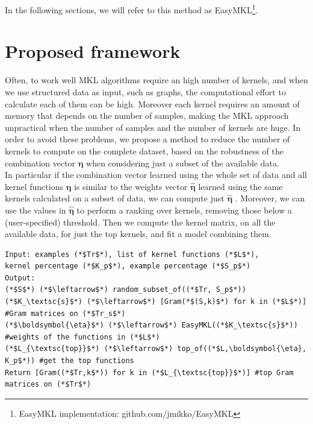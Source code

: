 \documentclass{esannV2}
\newcommand{\yy}{{\bf y}}
\newcommand{\KK}{{\bf K}}
\newcommand{\YY}{{\bf Y}}
\newcommand{\XX}{{\bf X}}
\newcommand{\1}{{\bf 1}}
\begin{document}
In the following sections, we will refer to this method as EasyMKL\footnote{EasyMKL implementation: github.com/jmikko/EasyMKL}.


\section{Proposed framework}
Often, to work well MKL algorithms require an high number of kernels, and when we use structured data as input, such as graphs, the computational effort to calculate each of them can be high. Moreover each kernel requires an amount of memory that depends on the number of samples, making the MKL approach unpractical when the number of samples and the number of kernels are huge.
In order to avoid these problems, we propose a method to reduce the number of kernels to compute on the complete dataset, based on the robustness of the combination vector $\boldsymbol{\eta}$ when considering just a subset of the available data.\\
In particular if the combination vector learned using the whole set of data and all kernel functions $\boldsymbol{\eta}$ is similar to the weights vector $\hat{\boldsymbol{\eta}}$ learned using the same kernels calculated on a subset of data, we can compute just $\hat{\boldsymbol{\eta}}$ .
Moreover, we can use the values in $\hat{\boldsymbol{\eta}}$ to perform a ranking over kernels, removing those below a (user-specified) threshold.
Then we compute the kernel matrix, on all the available data, for just the top kernels, and fit a model combining them.



\begin{lstlisting}
Input: examples (*$Tr$*), list of kernel functions (*$L$*),
kernel percentage (*$K_p$*), example percentage (*$S_p$*) 
Output: 
(*$S$*) (*$\leftarrow$*) random_subset_of((*$Tr, S_p$*))
(*$K_\textsc{s}$*) (*$\leftarrow$*) [Gram(*$(S,k)$*) for k in (*$L$*)] #Gram matrices on (*$Tr_s$*)
(*$\boldsymbol{\eta}$*) (*$\leftarrow$*) EasyMKL((*$K_\textsc{s}$*)) #weights of the functions in (*$L$*)
(*$L_{\textsc{top}}$*) (*$\leftarrow$*) top_of((*$L,\boldsymbol{\eta}, K_p$*)) #get the top functions
Return [Gram((*$Tr,k$*)) for k in (*$L_{\textsc{top}}$*)] #top Gram matrices on (*$Tr$*)
\end{lstlisting}
\end{document}
